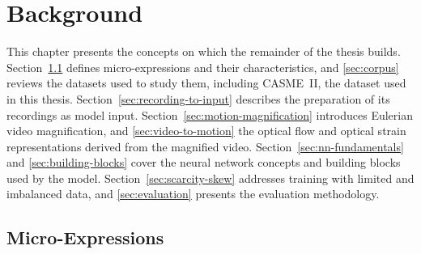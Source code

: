 %
%
%
%

\chapter{Background}
\label{ch:background}

This chapter presents the concepts on which the remainder of the thesis builds. Section~\ref{sec:phenomenon} defines micro-expressions and their characteristics, and \autoref{sec:corpus} reviews the datasets used to study them, including CASME~II, the dataset used in this thesis. Section~\ref{sec:recording-to-input} describes the preparation of its recordings as model input. Section~\ref{sec:motion-magnification} introduces Eulerian video magnification, and \autoref{sec:video-to-motion} the optical flow and optical strain representations derived from the magnified video. Section~\ref{sec:nn-fundamentals} and \autoref{sec:building-blocks} cover the neural network concepts and building blocks used by the model. Section~\ref{sec:scarcity-skew} addresses training with limited and imbalanced data, and \autoref{sec:evaluation} presents the evaluation methodology.


\section{Micro-Expressions}
\label{sec:phenomenon}

